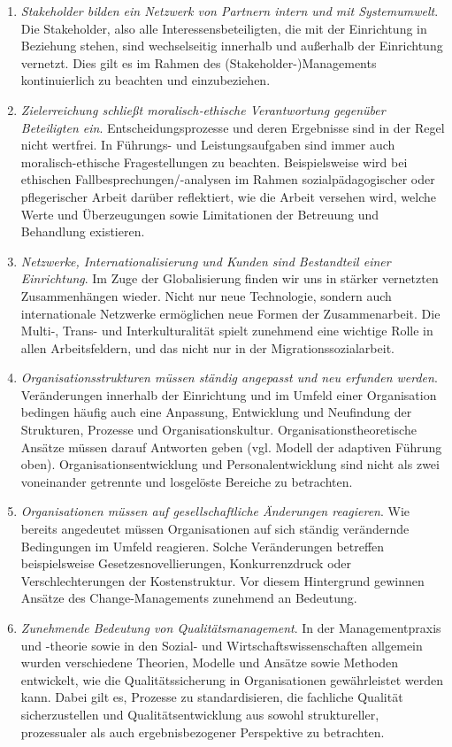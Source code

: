 \documentclass[
  letterpaper,
]{book}
\begin{document}
\begin{enumerate}
\def\labelenumi{\arabic{enumi}.}
\item
  \emph{Stakeholder bilden ein Netzwerk von Partnern intern und mit
  Systemumwelt}. Die Stakeholder, also alle Interessensbeteiligten, die
  mit der Einrichtung in Beziehung stehen, sind wechselseitig innerhalb
  und außerhalb der Einrichtung vernetzt. Dies gilt es im Rahmen des
  (Stakeholder-)Managements kontinuierlich zu beachten und
  einzubeziehen.
\item
  \emph{Zielerreichung schließt moralisch‐ethische Verantwortung
  gegenüber Beteiligten ein}. Entscheidungsprozesse und deren Ergebnisse
  sind in der Regel nicht wertfrei. In Führungs- und Leistungsaufgaben
  sind immer auch moralisch-ethische Fragestellungen zu beachten.
  Beispielsweise wird bei ethischen Fallbesprechungen/-analysen im
  Rahmen sozialpädagogischer oder pflegerischer Arbeit darüber
  reflektiert, wie die Arbeit versehen wird, welche Werte und
  Überzeugungen sowie Limitationen der Betreuung und Behandlung
  existieren.
\item
  \emph{Netzwerke, Internationalisierung und Kunden sind Bestandteil
  einer Einrichtung}. Im Zuge der Globalisierung finden wir uns in
  stärker vernetzten Zusammenhängen wieder. Nicht nur neue Technologie,
  sondern auch internationale Netzwerke ermöglichen neue Formen der
  Zusammenarbeit. Die Multi-, Trans- und Interkulturalität spielt
  zunehmend eine wichtige Rolle in allen Arbeitsfeldern, und das nicht
  nur in der Migrationssozialarbeit.
\item
  \emph{Organisationsstrukturen müssen ständig angepasst und neu
  erfunden werden}. Veränderungen innerhalb der Einrichtung und im
  Umfeld einer Organisation bedingen häufig auch eine Anpassung,
  Entwicklung und Neufindung der Strukturen, Prozesse und
  Organisationskultur. Organisationstheoretische Ansätze müssen darauf
  Antworten geben (vgl. Modell der adaptiven Führung oben).
  Organisationsentwicklung und Personalentwicklung sind nicht als zwei
  voneinander getrennte und losgelöste Bereiche zu betrachten.
\item
  \emph{Organisationen müssen auf gesellschaftliche Änderungen
  reagieren}. Wie bereits angedeutet müssen Organisationen auf sich
  ständig verändernde Bedingungen im Umfeld reagieren. Solche
  Veränderungen betreffen beispielsweise Gesetzesnovellierungen,
  Konkurrenzdruck oder Verschlechterungen der Kostenstruktur. Vor diesem
  Hintergrund gewinnen Ansätze des Change-Managements zunehmend an
  Bedeutung.
\item
  \emph{Zunehmende Bedeutung von Qualitätsmanagement}. In der
  Managementpraxis und -theorie sowie in den Sozial- und
  Wirtschaftswissenschaften allgemein wurden verschiedene Theorien,
  Modelle und Ansätze sowie Methoden entwickelt, wie die
  Qualitätssicherung in Organisationen gewährleistet werden kann. Dabei
  gilt es, Prozesse zu standardisieren, die fachliche Qualität
  sicherzustellen und Qualitätsentwicklung aus sowohl struktureller,
  prozessualer als auch ergebnisbezogener Perspektive zu betrachten.
\end{enumerate}
\end{document}
